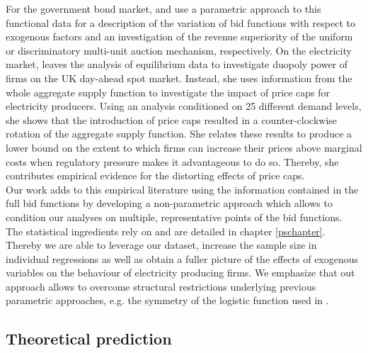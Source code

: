 For the government bond market, \cite{preget2005treasury} and \cite{ozcan2004logistic} use a parametric approach to this functional data for a description of the variation of bid functions with respect to exogenous factors and an investigation of the revenue superiority of the uniform or discriminatory multi-unit auction mechanism, respectively. On the electricity market,  \cite{wolfram1999measuring} leaves the analysis of equilibrium data to investigate duopoly power of firms on the UK day-ahead spot market. Instead, she uses information from the whole aggregate supply function to investigate the impact of price caps for electricity producers. Using an analysis conditioned on 25 different demand levels, she shows that the introduction of price caps resulted in a counter-clockwise rotation of the aggregate supply function. She relates these results to produce a lower bound on the extent to which firms can increase their prices above marginal costs when regulatory pressure makes it advantageous to do so. Thereby, she contributes  empirical evidence for the distorting effects of price caps. \\

Our work adds to this empirical literature using the information contained in the full bid functions 
by developing a non-parametric approach which allows to condition our analyses on multiple, representative points of the bid functions. The statistical ingredients rely on \cite{ramsaysilverman2005functional} and are detailed in chapter \ref{pschapter}.
Thereby we are able to leverage our dataset, increase the sample size in individual regressions as well as obtain a fuller picture of the effects of exogenous variables on the behaviour of electricity producing firms. We emphasize that out approach allows to overcome structural restrictions underlying previous parametric approaches, e.g. the symmetry of the logistic function used in \cite{pw2002etude}.



\subsection{Theoretical prediction}
\label{intropredict}

